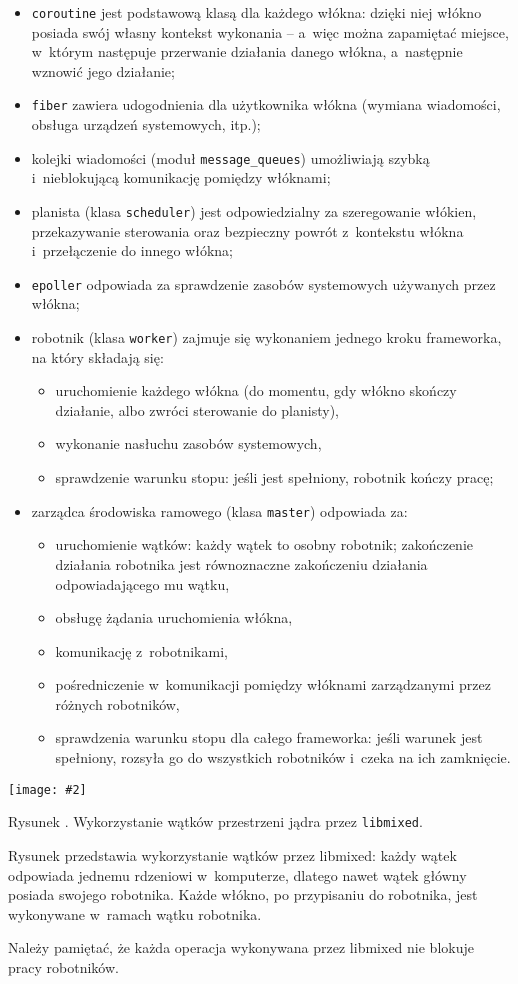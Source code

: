 \documentclass[12pt]{mwart}
\newcommand{\code}{\texttt}
\newcounter{figmain}
\newcommand{\myownfigure}[4]{ \newcounter{#1} \setcounter{#1}{\value{figmain}} \addtocounter{figmain}{1} \begin{center} \label{fig:#1} \centering \texttt{[image: \#2]}\\ \nopagebreak[5] \parbox[t]{11.5cm}{Rysunek \arabic{#1}. #3.} \end{center}}
\begin{document}
  \begin{itemize}
    \item \code{coroutine} jest podstawową klasą dla każdego włókna: dzięki niej włókno posiada swój własny kontekst wykonania -- a~więc można zapamiętać miejsce,
      w~którym następuje przerwanie działania danego włókna, a~następnie wznowić jego działanie;
    \item \code{fiber} zawiera udogodnienia dla użytkownika włókna (wymiana wiadomości, obsługa urządzeń systemowych, itp.);
    \item kolejki wiadomości (moduł \code{message\_queues}) umożliwiają szybką i~nieblokującą komunikację pomiędzy włóknami;
    \item planista (klasa \code{scheduler}) jest odpowiedzialny za szeregowanie włókien, przekazywanie sterowania oraz bezpieczny powrót z~kontekstu włókna i~przełączenie do innego włókna;
    \item \code{epoller} odpowiada za sprawdzenie zasobów systemowych używanych przez włókna;
    \item robotnik (klasa \code{worker}) zajmuje się wykonaniem jednego kroku framework\dywiz a, na który składają się:
      \begin{itemize}
        \item uruchomienie każdego włókna (do momentu, gdy włókno skończy działanie, albo zwróci sterowanie do planisty),
        \item wykonanie nasłuchu zasobów systemowych,
        \item sprawdzenie warunku stopu: jeśli jest spełniony, robotnik kończy pracę;
      \end{itemize}
    \item zarządca środowiska ramowego (klasa \code{master}) odpowiada za:
      \begin{itemize}
        \item uruchomienie wątków: każdy wątek to osobny robotnik; zakończenie działania robotnika jest równoznaczne zakończeniu działania odpowiadającego mu wątku,
        \item obsługę żądania uruchomienia włókna,
        \item komunikację z~robotnikami,
        \item pośredniczenie w~komunikacji pomiędzy włóknami zarządzanymi przez różnych robotników,
        \item sprawdzenia warunku stopu dla całego framework\dywiz a: jeśli warunek jest spełniony, rozsyła go do wszystkich robotników i~czeka na ich zamknięcie.
      \end{itemize}
  \end{itemize}
\par
%
\indent
  \myownfigure{libmixeddeployment}{Deployment.png}{Wykorzystanie wątków przestrzeni jądra przez \code{libmixed}}{.7}
  Rysunek  przedstawia wykorzystanie wątków przez libmixed: każdy wątek odpowiada jednemu rdzeniowi w~komputerze, dlatego nawet wątek główny
  posiada swojego robotnika. Każde włókno, po przypisaniu do robotnika, jest wykonywane w~ramach wątku robotnika.
\par
\indent
  Należy pamiętać, że każda operacja wykonywana przez libmixed nie blokuje pracy robotników.
\par
\newpage
\end{document}
